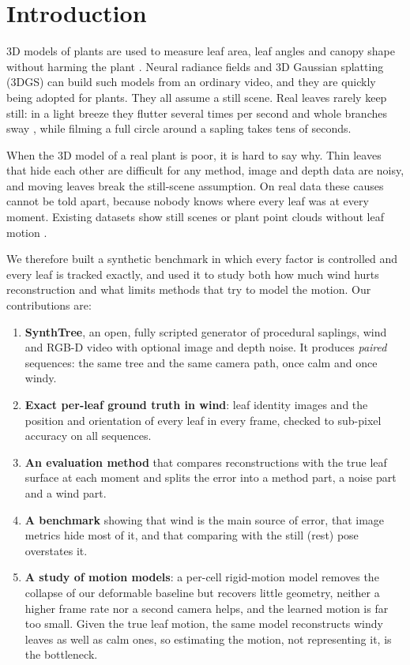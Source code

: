 \documentclass[preprint,11pt,authoryear]{elsarticle}
\begin{document}
\section{Introduction}
3D models of plants are used to measure leaf area, leaf angles and canopy shape without harming the plant \citep{paulus2019crops3d}. Neural radiance fields \citep{mildenhall2020nerf,muller2022instant} and 3D Gaussian splatting (3DGS) \citep{kerbl2023gaussian} can build such models from an ordinary video, and they are quickly being adopted for plants. They all assume a still scene. Real leaves rarely keep still: in a light breeze they flutter several times per second and whole branches sway \citep{delangre2008wind}, while filming a full circle around a sapling takes tens of seconds.

When the 3D model of a real plant is poor, it is hard to say why. Thin leaves that hide each other are difficult for any method, image and depth data are noisy, and moving leaves break the still-scene assumption. On real data these causes cannot be told apart, because nobody knows where every leaf was at every moment. Existing datasets show still scenes \citep{jensen2014dtu,knapitsch2017tanks,sturm2012tum} or plant point clouds without leaf motion \citep{schunck2021pheno4d}.

We therefore built a synthetic benchmark in which every factor is controlled and every leaf is tracked exactly, and used it to study both how much wind hurts reconstruction and what limits methods that try to model the motion. Our contributions are:
\begin{enumerate}
\item \textbf{SynthTree}, an open, fully scripted generator of procedural saplings, wind and RGB-D video with optional image and depth noise. It produces \emph{paired} sequences: the same tree and the same camera path, once calm and once windy.
\item \textbf{Exact per-leaf ground truth in wind}: leaf identity images and the position and orientation of every leaf in every frame, checked to sub-pixel accuracy on all sequences.
\item \textbf{An evaluation method} that compares reconstructions with the true leaf surface at each moment and splits the error into a method part, a noise part and a wind part.
\item \textbf{A benchmark} showing that wind is the main source of error, that image metrics hide most of it, and that comparing with the still (rest) pose overstates it.
\item \textbf{A study of motion models}: a per-cell rigid-motion model removes the collapse of our deformable baseline but recovers little geometry, neither a higher frame rate nor a second camera helps, and the learned motion is far too small. Given the true leaf motion, the same model reconstructs windy leaves as well as calm ones, so estimating the motion, not representing it, is the bottleneck.
\end{enumerate}
\end{document}
